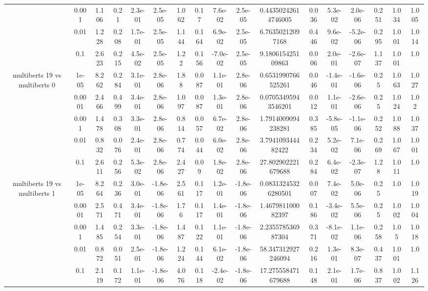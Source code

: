 \begin{tabular}{|c|c|c|c|c|c|c|c|c|c|c|c|c|c|c|c|c|}
 & 0.001 & 1.106 & 0.21 & 2.3e-01 & 2.5e-05 & 1.062 & 0.17 & 7.6e-02 & 2.5e-05 & 0.44350242614746005 & 0.036 & 5.3e-02 & 2.0e-06 & 0.251 & 1.034 & 1.005 \\
 & 0.01 & 1.228 & 0.208 & 1.7e-01 & 2.5e-05 & 1.144 & 0.164 & 6.9e-02 & 2.5e-05 & 6.76350212097168 & 0.446 & 9.6e-02 & -5.2e-06 & 0.295 & 1.001 & 1.014 \\
 & 0.1 & 2.623 & 0.215 & 4.5e-02 & 2.5e-05 & 1.22 & 0.156 & -7.0e-02 & 2.5e-05 & 9.180615425109863 & 0.006 & 2.0e-01 & -2.6e-07 & 1.137 & 1.001 & 1.0 \\
\hline
\multirow{5}{*}{multiberts 19 vs multiberts 0} & 1e-05 & 8.262 & 0.284 & 3.1e-01 & 2.8e-06 & 1.88 & 0.087 & 1.1e-01 & 2.8e-06 & 0.6531990766525261 & 0.046 & -1.4e-01 & -1.6e-06 & 0.25 & 1.063 & 1.027 \\
 & 0.0001 & 2.466 & 0.499 & 3.4e-01 & 2.8e-06 & 1.097 & 0.087 & 1.3e-01 & 2.8e-06 & 0.07053495943546201 & 0.012 & 1.1e-01 & -2.6e-06 & 0.25 & 1.024 & 1.02 \\
 & 0.001 & 1.478 & 0.308 & 3.3e-01 & 2.8e-06 & 0.814 & 0.057 & 6.7e-02 & 2.8e-06 & 1.7914009094238281 & 0.385 & -5.8e-05 & -1.1e-06 & 0.252 & 1.088 & 1.037 \\
 & 0.01 & 0.832 & 0.076 & 2.4e-01 & 2.8e-06 & 0.774 & 0.044 & 6.0e-02 & 2.8e-06 & 3.794109344482422 & 0.234 & 5.2e-02 & 7.1e-06 & 0.269 & 1.067 & 1.001 \\
 & 0.1 & 2.611 & 0.256 & 5.3e-02 & 2.8e-06 & 2.427 & 0.09 & 1.8e-02 & 2.8e-06 & 27.802902221679688 & 0.284 & 6.4e-02 & -2.3e-07 & 1.28 & 1.011 & 1.0 \\
\hline
\multirow{5}{*}{multiberts 19 vs multiberts 1} & 1e-05 & 8.264 & 0.236 & 3.0e-01 & -1.8e-06 & 2.561 & 0.117 & 1.2e-01 & -1.8e-06 & 0.08313245326280501 & 0.007 & 7.4e-02 & 5.0e-06 & 0.25 & 1.0 & 1.019 \\
 & 0.0001 & 2.571 & 0.471 & 3.4e-01 & -1.8e-06 & 1.76 & 0.117 & 1.4e-01 & -1.8e-06 & 1.467981100082397 & 0.186 & -3.4e-02 & 5.5e-06 & 0.25 & 1.002 & 1.004 \\
 & 0.001 & 1.485 & 0.254 & 3.3e-01 & -1.8e-06 & 1.487 & 0.122 & 1.1e-01 & -1.8e-06 & 2.235578536987304 & 0.371 & -8.1e-02 & 1.1e-06 & 0.258 & 1.05 & 1.018 \\
 & 0.01 & 0.872 & 0.051 & 2.5e-01 & -1.8e-06 & 1.224 & 0.144 & 6.1e-02 & -1.8e-06 & 58.347312927246094 & 0.216 & 1.3e-01 & 8.3e-07 & 0.437 & 1.001 & 1.0 \\
 & 0.1 & 2.119 & 0.172 & 1.1e-01 & -1.8e-06 & 4.076 & 0.118 & -2.4e-02 & -1.8e-06 & 17.275558471679688 & 0.148 & 2.1e-01 & 1.7e-06 & 0.837 & 1.002 & 1.126 \\

\end{tabular}
